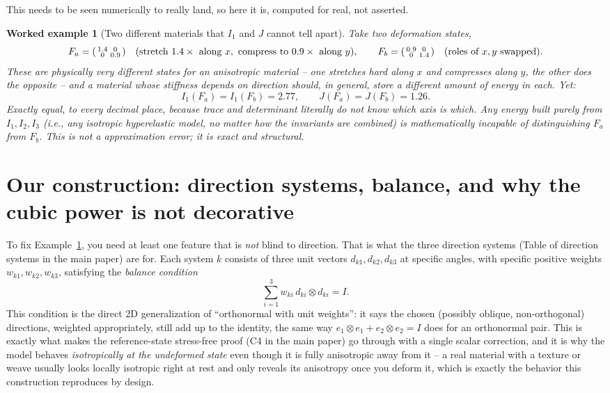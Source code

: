 \documentclass[11pt,a4paper]{article}
\newtheorem{worked}{Worked example}
\begin{document}
This needs to be seen numerically to really land, so here it is,
computed for real, not asserted.

\begin{worked}[Two different materials that $I_1$ and $J$ cannot tell apart]
\label{ex:isotropy-blind}
Take two deformation states,
\[
 F_a=\begin{psmallmatrix}1.4&0\\0&0.9\end{psmallmatrix}
 \quad(\text{stretch }1.4\times\text{ along }x,\ \text{compress to }0.9\times\text{ along }y),
 \qquad
 F_b=\begin{psmallmatrix}0.9&0\\0&1.4\end{psmallmatrix}
 \quad(\text{roles of }x,y\text{ swapped}).
\]
These are physically very different states for an anisotropic
material -- one stretches hard along $x$ and compresses along $y$, the
other does the opposite -- and a material whose stiffness depends on
direction should, in general, store a different amount of energy in
each. Yet:
\[
 I_1(F_a)=I_1(F_b)=2.77, \qquad J(F_a)=J(F_b)=1.26 .
\]
Exactly equal, to every decimal place, because trace and determinant
literally do not know which axis is which. \emph{Any} energy built
purely from $I_1,I_2,I_3$ (i.e., any \emph{isotropic} hyperelastic
model, no matter how the invariants are combined) is mathematically
incapable of distinguishing $F_a$ from $F_b$. This is not a
approximation error; it is exact and structural.
\end{worked}

\section{Our construction: direction systems, balance, and why the cubic power is not decorative}
\label{sec:our-construction}

To fix Example~\ref{ex:isotropy-blind}, you need at least one feature
that is \emph{not} blind to direction. That is what the three
direction systems (Table of direction systems in the main paper) are
for. Each system $k$ consists of three unit vectors $d_{k1},d_{k2},
d_{k3}$ at specific angles, with specific positive weights $w_{k1},
w_{k2},w_{k3}$, satisfying the \emph{balance condition}
\begin{equation}
 \sum_{i=1}^3 w_{ki}\,d_{ki}\otimes d_{ki} = I .
 \label{eq:balance}
\end{equation}
This condition is the direct 2D generalization of ``orthonormal with
unit weights'': it says the chosen (possibly oblique, non-orthogonal)
directions, weighted appropriately, still add up to the identity, the
same way $e_1\otimes e_1+e_2\otimes e_2=I$ does for an orthonormal
pair. This is exactly what makes the reference-state stress-free
proof (C4 in the main paper) go through with a single scalar
correction, and it is why the model behaves \emph{isotropically at the
undeformed state} even though it is fully anisotropic away from it --
a real material with a texture or weave usually looks locally isotropic
right at rest and only reveals its anisotropy once you deform it, which
is exactly the behavior this construction reproduces by design.
\end{document}

